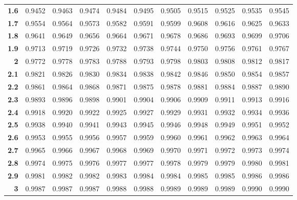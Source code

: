 \begin{table}[ht]
\begin{tabular}{rrrrrrrrrrr}
  \textbf{1.6} & 0.9452 & 0.9463 & 0.9474 & 0.9484 & 0.9495 & 0.9505 & 0.9515 & 0.9525 & 0.9535 & 0.9545 \\
  \textbf{1.7} & 0.9554 & 0.9564 & 0.9573 & 0.9582 & 0.9591 & 0.9599 & 0.9608 & 0.9616 & 0.9625 & 0.9633 \\
  \textbf{1.8} & 0.9641 & 0.9649 & 0.9656 & 0.9664 & 0.9671 & 0.9678 & 0.9686 & 0.9693 & 0.9699 & 0.9706 \\
  \textbf{1.9} & 0.9713 & 0.9719 & 0.9726 & 0.9732 & 0.9738 & 0.9744 & 0.9750 & 0.9756 & 0.9761 & 0.9767 \\
  \textbf{2} & 0.9772 & 0.9778 & 0.9783 & 0.9788 & 0.9793 & 0.9798 & 0.9803 & 0.9808 & 0.9812 & 0.9817 \\
  \textbf{2.1} & 0.9821 & 0.9826 & 0.9830 & 0.9834 & 0.9838 & 0.9842 & 0.9846 & 0.9850 & 0.9854 & 0.9857 \\
  \textbf{2.2} & 0.9861 & 0.9864 & 0.9868 & 0.9871 & 0.9875 & 0.9878 & 0.9881 & 0.9884 & 0.9887 & 0.9890 \\
  \textbf{2.3} & 0.9893 & 0.9896 & 0.9898 & 0.9901 & 0.9904 & 0.9906 & 0.9909 & 0.9911 & 0.9913 & 0.9916 \\
  \textbf{2.4} & 0.9918 & 0.9920 & 0.9922 & 0.9925 & 0.9927 & 0.9929 & 0.9931 & 0.9932 & 0.9934 & 0.9936 \\
  \textbf{2.5} & 0.9938 & 0.9940 & 0.9941 & 0.9943 & 0.9945 & 0.9946 & 0.9948 & 0.9949 & 0.9951 & 0.9952 \\
  \textbf{2.6} & 0.9953 & 0.9955 & 0.9956 & 0.9957 & 0.9959 & 0.9960 & 0.9961 & 0.9962 & 0.9963 & 0.9964 \\
  \textbf{2.7} & 0.9965 & 0.9966 & 0.9967 & 0.9968 & 0.9969 & 0.9970 & 0.9971 & 0.9972 & 0.9973 & 0.9974 \\
  \textbf{2.8} & 0.9974 & 0.9975 & 0.9976 & 0.9977 & 0.9977 & 0.9978 & 0.9979 & 0.9979 & 0.9980 & 0.9981 \\
  \textbf{2.9} & 0.9981 & 0.9982 & 0.9982 & 0.9983 & 0.9984 & 0.9984 & 0.9985 & 0.9985 & 0.9986 & 0.9986 \\
  \textbf{3} & 0.9987 & 0.9987 & 0.9987 & 0.9988 & 0.9988 & 0.9989 & 0.9989 & 0.9989 & 0.9990 & 0.9990 \\
   \hline
\end{tabular}
\end{table}
